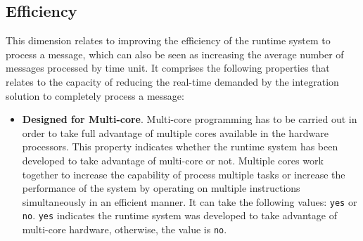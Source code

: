\subsection{{Efficiency}}
\label{subsec:efficiency}
This dimension relates to improving the efficiency of the runtime system to process a message, which can also be seen as increasing the average number of messages processed by time unit. It comprises the following properties that relates to the capacity of reducing the real-time demanded by the integration solution to completely process a message:
\begin{itemize} 
\item \textbf{Designed for Multi-core}. Multi-core programming has to be carried out in order to take full advantage of multiple cores available in the hardware processors. This property indicates whether the runtime system has been developed to take advantage of multi-core or not. Multiple cores work together to increase the capability of process multiple tasks or increase the performance of the system by operating on multiple instructions simultaneously in an efficient manner. It can take the following values: \texttt{yes} or \texttt{no}. \texttt{yes} indicates the runtime system was developed to take advantage of multi-core hardware, otherwise, the value is \texttt{no}.


\end{itemize}
